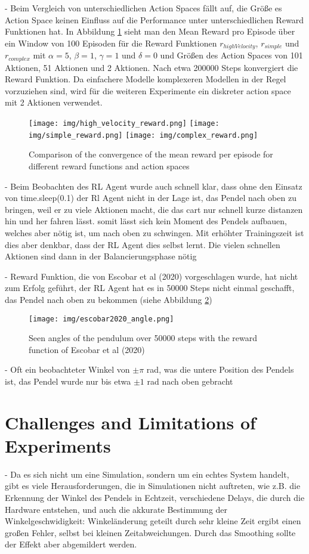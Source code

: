 - Beim Vergleich von unterschiedlichen Action Spaces fällt auf, die Größe es Action Space keinen Einfluss auf die Performance unter unterschiedlichen Reward Funktionen hat. In Abbildung \ref{fig:action_space_comparison} sieht man den Mean Reward pro Episode über ein Window von 100 Episoden für die Reward Funktionen $r_{highVelocity}$, $r_{simple}$ und $r_{complex}$ mit $\alpha=5$, $\beta=1$, $\gamma=1$ und $\delta=0$ und Größen des Action Spaces von 101 Aktionen, 51 Aktionen und 2 Aktionen. Nach etwa 200000 Steps konvergiert die Reward Funktion. Da einfachere Modelle komplexeren Modellen in der Regel vorzuziehen sind, wird für die weiteren Experimente ein diskreter action space mit 2 Aktionen verwendet.
\begin{figure}[htbp]
    \centering
    \texttt{[image: img/high\_velocity\_reward.png]}
    \texttt{[image: img/simple\_reward.png]}
    \texttt{[image: img/complex\_reward.png]}
    \caption{Comparison of the convergence of the mean reward per episode for different reward functions and action spaces}
    \label{fig:action_space_comparison}
\end{figure}
- Beim Beobachten des RL Agent wurde auch schnell klar, dass ohne den Einsatz von time.sleep(0.1) der Rl Agent nicht in der Lage ist, das Pendel nach oben zu bringen, weil er zu viele Aktionen macht, die das cart nur schnell kurze distanzen hin und her fahren lässt. somit lässt sich kein Moment des Pendels aufbauen, welches aber nötig ist, um nach oben zu schwingen. Mit erhöhter Trainingszeit ist dies aber denkbar, dass der RL Agent dies selbst lernt. Die vielen schnellen Aktionen sind dann in der Balancierungsphase nötig

- Reward Funktion, die von Escobar et al (2020) vorgeschlagen wurde, hat nicht zum Erfolg geführt, der RL Agent hat es in 50000 Steps nicht einmal geschafft, das Pendel nach oben zu bekommen (siehe Abbildung \ref{fig:angle_escobar2020})
\begin{figure}[htbp]
    \centering
    \texttt{[image: img/escobar2020\_angle.png]}
    \caption{Seen angles of the pendulum over 50000 steps with the reward function of Escobar et al (2020)}
    \label{fig:angle_escobar2020}
\end{figure}
- Oft ein beobachteter Winkel von $\pm\pi$ rad, was die untere Position des Pendels ist, das Pendel wurde nur bis etwa $\pm 1$ rad nach oben gebracht %

\section{Challenges and Limitations of Experiments}
- Da es sich nicht um eine Simulation, sondern um ein echtes System handelt, gibt es viele Herausforderungen, die in Simulationen nicht auftreten, wie z.B. die Erkennung der Winkel des Pendels in Echtzeit, verschiedene Delays, die durch die Hardware entstehen, und auch die akkurate Bestimmung der Winkelgeschwidigkeit: Winkeländerung geteilt durch sehr kleine Zeit ergibt einen großen Fehler, selbst bei kleinen Zeitabweichungen. Durch das Smoothing sollte der Effekt aber abgemildert werden.

